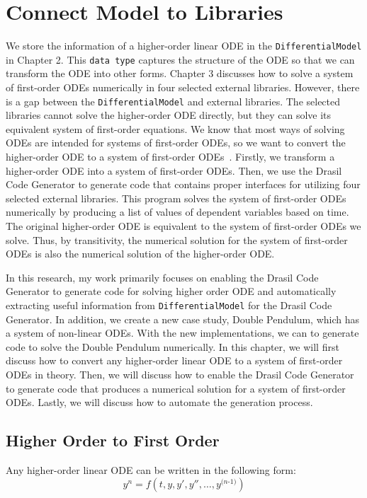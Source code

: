 \chapter{Connect Model to Libraries}
We store the information of a higher-order linear ODE in the \verb|DifferentialModel| in Chapter 2. This \verb|data type| captures the structure of the ODE so that we can transform the ODE into other forms. Chapter 3 discusses how to solve a system of first-order ODEs numerically in four selected external libraries. However, there is a gap between the \verb|DifferentialModel| and external libraries. The selected libraries cannot solve the higher-order ODE directly, but they can solve its equivalent system of first-order equations. We know that most ways of solving ODEs are intended for systems of first-order ODEs, so we want to convert the higher-order ODE to a system of first-order ODEs~\citep{converthigherode}. Firstly, we transform a higher-order ODE into a system of first-order ODEs. Then, we use the Drasil Code Generator to generate code that contains proper interfaces for utilizing four selected external libraries. This program solves the system of first-order ODEs numerically by producing a list of values of dependent variables based on time. The original higher-order ODE is equivalent to the system of first-order ODEs we solve. Thus, by transitivity, the numerical solution for the system of first-order ODEs is also the numerical solution of the higher-order ODE.

In this research, my work primarily focuses on enabling the Drasil Code Generator to generate code for solving higher order ODE and automatically extracting useful information from \verb|DifferentialModel| for the Drasil Code Generator. In addition, we create a new case study, Double Pendulum, which has a system of non-linear ODEs. With the new implementations, we can to generate code to solve the Double Pendulum numerically. In this chapter, we will first discuss how to convert any higher-order linear ODE to a system of first-order ODEs in theory. Then, we will discuss how to enable the Drasil Code Generator to generate code that produces a numerical solution for a system of first-order ODEs. Lastly, we will discuss how to automate the generation process.

\section{Higher Order to First Order}
\label{se_hightofirst}
Any higher-order linear ODE can be written in the following form:
\begin{equation} \label{eq_isohighode}
  y^n = f (t, y, y', y'', \dots, y^{\textit{(n-1)}})
\end{equation}

